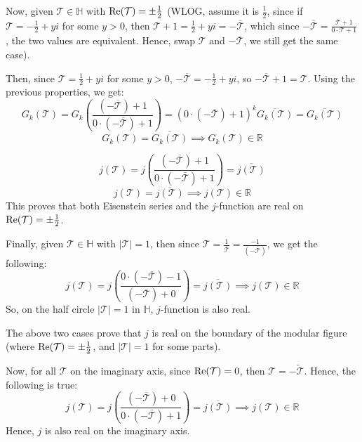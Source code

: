 \documentclass{article}
\begin{document}
\hfil

Now, given $\mathcal{T}\in\mathbb{H}$ with $\textmd{Re}(\mathcal{T})=\pm\frac{1}{2}$ (WLOG, assume it is $\frac{1}{2}$, since if $\mathcal{T}=-\frac{1}{2}+yi$ for some $y>0$, then $\mathcal{T}+1 = \frac{1}{2}+yi = -\overline{\mathcal{T}}$, which since $-\overline{\mathcal{T}}=\frac{\mathcal{T}+1}{0\cdot\mathcal{T}+1}$, the two values are equivalent. Hence, swap $\mathcal{T}$ and $-\overline{\mathcal{T}}$, we still get the same case).

Then, since $\mathcal{T}=\frac{1}{2}+yi$ for some $y>0$, $-\overline{\mathcal{T}} = -\frac{1}{2}+yi$, so $-\overline{\mathcal{T}}+1 = \mathcal{T}$. Using the previous properties, we get:
$$G_k(\mathcal{T})=G_k\left(\frac{(-\overline{\mathcal{T}})+1}{0\cdot(-\overline{\mathcal{T}})+1}\right) = (0\cdot(-\overline{\mathcal{T}})+1)^k\overline{G_k(\mathcal{T})} = \overline{G_k(\mathcal{T})}$$
$$G_k(\mathcal{T})=\overline{G_k(\mathcal{T})}\implies G_k(\mathcal{T})\in \mathbb{R}$$

$$j(\mathcal{T})=j\left(\frac{(-\overline{\mathcal{T}})+1}{0\cdot(-\overline{\mathcal{T}})+1}\right) = \overline{j(\mathcal{T})}$$
$$j(\mathcal{T})=\overline{j(\mathcal{T})}\implies j(\mathcal{T})\in\mathbb{R}$$
This proves that both Eisenstein series and the $j$-function are real on $\textmd{Re}(\mathcal{T})=\pm\frac{1}{2}$.

Finally, given $\mathcal{T}\in\mathbb{H}$ with $|\mathcal{T}|=1$, then since $\mathcal{T}=\frac{1}{\overline{\mathcal{T}}}=\frac{-1}{(-\overline{\mathcal{T}})}$, we get the following:
$$j(\mathcal{T})=j\left(\frac{0\cdot(-\overline{\mathcal{T}})-1}{(-\overline{\mathcal{T}})+0}\right) = \overline{j(\mathcal{T})} \implies j(\mathcal{T})\in\mathbb{R}$$
So, on the half circle $|\mathcal{T}|=1$ in $\mathbb{H}$, $j$-function is also real.

\hfil

The above two cases prove that $j$ is real on the boundary of the modular figure (where $\textmd{Re}(\mathcal{T})=\pm\frac{1}{2}$, and $|\mathcal{T}|=1$ for some parts).

Now, for all $\mathcal{T}$ on the imaginary axis, since $\textmd{Re}(\mathcal{T})=0$, then $\mathcal{T} = -\overleftarrow{\mathcal{T}}$. Hence, the following is true:
$$j(\mathcal{T})=j\left(\frac{(-\overline{\mathcal{T}})+0}{0\cdot(-\overline{\mathcal{T}})+1}\right) = \overline{j(\mathcal{T})} \implies j(\mathcal{T})\in\mathbb{R}$$
Hence, $j$ is also real on the imaginary axis.
\end{document}
